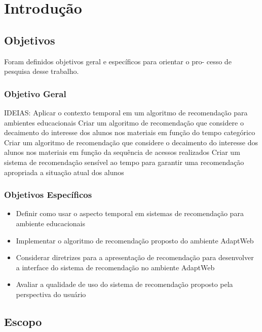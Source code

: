 \chapter{Introdução}\label{introducao}

\section{Objetivos}

Foram definidos objetivos geral e específicos para orientar o pro- cesso de pesquisa desse trabalho.

\subsection{Objetivo Geral}

IDEIAS:
Aplicar o contexto temporal em um algoritmo de recomendação para ambientes educacionais
Criar um algoritmo de recomendação que considere o decaimento do interesse dos alunos nos materiais em função do
tempo categórico
Criar um algoritmo de recomendação que considere o decaimento do interesse dos alunos nos materiais em função da
sequência de acessos realizados
Criar um sistema de recomendação sensível ao tempo para garantir uma recomendação apropriada a situação atual dos alunos

\subsection{Objetivos Específicos}

\begin{itemize}
\item Definir como usar o aspecto temporal em sistemas de recomendação para ambiente educacionais
\item Implementar o algoritmo de recomendação proposto do ambiente AdaptWeb\textsuperscript{\textregistered}
\item Considerar diretrizes para a apresentação de recomendação para desenvolver a interface do sistema de recomendação
no ambiente AdaptWeb\textsuperscript{\textregistered}
\item Avaliar a qualidade de uso do sistema de recomendação proposto pela perspectiva do usuário
\end{itemize}

\section{Escopo}


